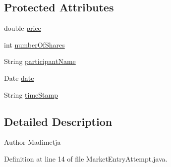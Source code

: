 \subsection*{Protected Attributes}
\begin{DoxyCompactItemize}
\item 
double \hyperlink{classfinancialmarketsimulator_1_1_market_entry_attempt_a6e3074ceef1578108b239a355b0a6747}{price}
\item 
int \hyperlink{classfinancialmarketsimulator_1_1_market_entry_attempt_a5333f3fb0b26cba3382a05e582f86d8a}{number\+Of\+Shares}
\item 
String \hyperlink{classfinancialmarketsimulator_1_1_market_entry_attempt_a3b4418b6906b72597b72ec50a245afce}{participant\+Name}
\item 
Date \hyperlink{classfinancialmarketsimulator_1_1_market_entry_attempt_a7dcd3bab8cbe1498e452bec851e5ec5d}{date}
\item 
String \hyperlink{classfinancialmarketsimulator_1_1_market_entry_attempt_acd62492a481b9db42703ce1c60a01ff3}{time\+Stamp}
\end{DoxyCompactItemize}


\subsection{Detailed Description}
\begin{DoxyAuthor}{Author}
Madimetja 
\end{DoxyAuthor}


Definition at line 14 of file Market\+Entry\+Attempt.\+java.



